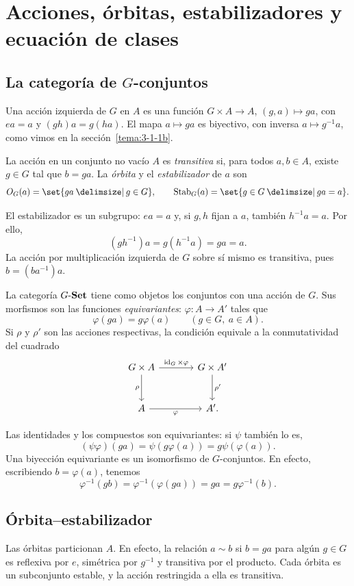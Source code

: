 \section{Acciones, órbitas, estabilizadores y ecuación de clases}\label{sec:grupos-acciones}

\subsection{La categoría de \texorpdfstring{$G$}{G}-conjuntos}\label{tema:6-1-1}
Una acción izquierda de $G$ en $A$ es una función $G\times A\to A$, $(g,a)\mapsto ga$, con $ea=a$ y $(gh)a=g(ha)$. El mapa $a\mapsto ga$ es biyectivo, con inversa $a\mapsto g^{-1}a$, como vimos en la sección~\ref{tema:3-1-1b}.

\begin{defi}
La acción en un conjunto no vacío $A$ es \emph{transitiva} si, para todos $a,b\in A$, existe $g\in G$ tal que $b=ga$. La \emph{órbita} y el \emph{estabilizador} de $a$ son
\[
O_G(a)=\set{ga\given g\in G},\qquad
\Stab_G(a)=\set{g\in G\given ga=a}.
\]
\end{defi}
El estabilizador es un subgrupo: $ea=a$ y, si $g,h$ fijan a $a$, también $h^{-1}a=a$. Por ello,
\[
(gh^{-1})a=g(h^{-1}a)=ga=a.
\]
La acción por multiplicación izquierda de $G$ sobre sí mismo es transitiva, pues $b=(ba^{-1})a$.

\begin{defi}
La categoría $G\text{-}\mathbf{Set}$ tiene como objetos los conjuntos con una acción de $G$. Sus morfismos son las funciones \emph{equivariantes}: $\varphi:A\to A'$ tales que
\[
\varphi(ga)=g\varphi(a)\qquad(g\in G,\ a\in A).
\]
Si $\rho$ y $\rho'$ son las acciones respectivas, la condición equivale a la conmutatividad del cuadrado
\[
\begin{tikzcd}[column sep=large,row sep=large]
G\times A\arrow[r,"\id_G\times\varphi"]\arrow[d,"\rho"']&G\times A'\arrow[d,"\rho'"]\\
A\arrow[r,"\varphi"']&A'.
\end{tikzcd}
\]
\end{defi}
Las identidades y los compuestos son equivariantes: si $\psi$ también lo es,
\[
(\psi\varphi)(ga)=\psi(g\varphi(a))=g\psi(\varphi(a)).
\]
Una biyección equivariante es un isomorfismo de $G$-conjuntos. En efecto, escribiendo $b=\varphi(a)$, tenemos
\[
\varphi^{-1}(gb)=\varphi^{-1}(\varphi(ga))=ga=g\varphi^{-1}(b).
\]

\subsection{Órbita--estabilizador}\label{tema:6-1-2}
Las órbitas particionan $A$. En efecto, la relación $a\sim b$ si $b=ga$ para algún $g\in G$ es reflexiva por $e$, simétrica por $g^{-1}$ y transitiva por el producto. Cada órbita es un subconjunto estable, y la acción restringida a ella es transitiva.

